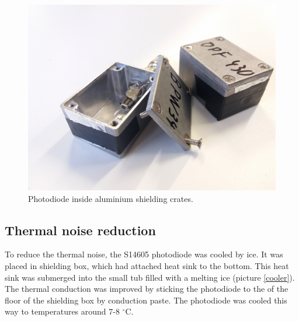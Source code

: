 \begin{figure}[H]
 \centering
 \includegraphics[scale=0.09, angle = 0]{./pictures/ShieldCrate.jpg}
 \caption{Photodiode inside aluminium shielding crates.}
 \label{crate}
 
\end{figure}


% 





\subsection{Thermal noise reduction}
To reduce the thermal noise, the S14605 photodiode was cooled by ice. It was placed in shielding box, which had attached heat sink to the bottom. This heat sink was submerged into the small tub filled with a melting ice (picture \ref{cooler}). The thermal conduction was improved by sticking the photodiode to the of the floor of the shielding box by conduction paste. The photodiode was cooled this way to temperatures around 7-8 $^\circ$C.


